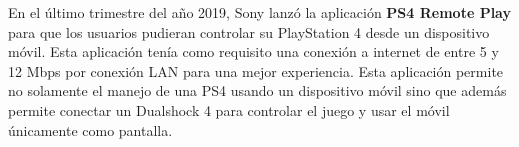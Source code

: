 En el \'ultimo trimestre del a\~no 2019, Sony lanz\'o la aplicaci\'on \textbf{PS4 Remote Play} para que los usuarios pudieran controlar su PlayStation 4 desde un dispositivo m\'ovil. Esta aplicaci\'on ten\'ia como requisito una conexi\'on a internet de entre 5 y 12 Mbps por conexi\'on LAN para una mejor experiencia. Esta aplicaci\'on permite no solamente el manejo de una PS4 usando un dispositivo m\'ovil sino que adem\'as permite conectar un Dualshock 4 para controlar el juego y usar el m\'ovil \'unicamente como pantalla.


